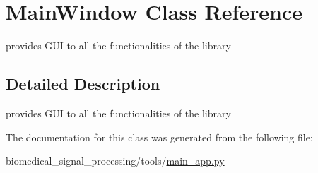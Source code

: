 \hypertarget{classMainWindow}{}\section{Main\+Window Class Reference}
\label{classMainWindow}


provides G\+UI to all the functionalities of the library  




\subsection{Detailed Description}
provides G\+UI to all the functionalities of the library 

The documentation for this class was generated from the following file\+:\begin{DoxyCompactItemize}
\item 
biomedical\+\_\+signal\+\_\+processing/tools/\hyperlink{main__app_8py}{main\+\_\+app.\+py}\end{DoxyCompactItemize}
